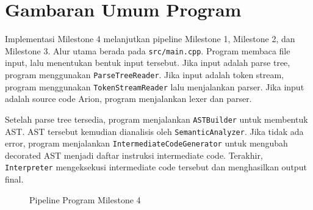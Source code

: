 \section{Gambaran Umum Program}
Implementasi Milestone 4 melanjutkan pipeline Milestone 1, Milestone 2, dan Milestone 3. Alur utama berada pada \texttt{src/main.cpp}. Program membaca file input, lalu menentukan bentuk input tersebut. Jika input adalah parse tree, program menggunakan \texttt{ParseTreeReader}. Jika input adalah token stream, program menggunakan \texttt{TokenStreamReader} lalu menjalankan parser. Jika input adalah source code Arion, program menjalankan lexer dan parser.

Setelah parse tree tersedia, program menjalankan \texttt{ASTBuilder} untuk membentuk AST. AST tersebut kemudian dianalisis oleh \texttt{SemanticAnalyzer}. Jika tidak ada error, program menjalankan \texttt{IntermediateCodeGenerator} untuk mengubah decorated AST menjadi daftar instruksi intermediate code. Terakhir, \texttt{Interpreter} mengeksekusi intermediate code tersebut dan menghasilkan output final.

\begin{figure}[H]
    \centering
    \caption{Pipeline Program Milestone 4}
    \label{fig:pipeline-program-m4}
\end{figure}

